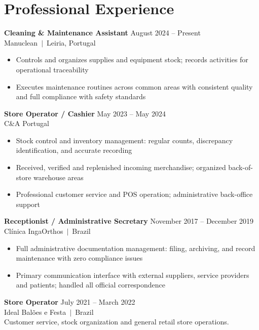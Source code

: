\documentclass[10pt,a4paper]{article}
\begin{document}
\section{Professional Experience}

{\small\bfseries Cleaning \& Maintenance Assistant}\hfill{\small\color{subtle} August 2024 -- Present}\\
{\small\color{accent} Manuclean~$|$~Leiria, Portugal}
\begin{itemize}\small
  \item Controls and organizes supplies and equipment stock; records activities for operational traceability
  \item Executes maintenance routines across common areas with consistent quality and full compliance with safety standards
\end{itemize}

\vspace{4pt}
{\small\bfseries Store Operator / Cashier}\hfill{\small\color{subtle} May 2023 -- May 2024}\\
{\small\color{accent} C\&A Portugal}
\begin{itemize}\small
  \item Stock control and inventory management: regular counts, discrepancy identification, and accurate recording
  \item Received, verified and replenished incoming merchandise; organized back-of-store warehouse areas
  \item Professional customer service and POS operation; administrative back-office support
\end{itemize}

\vspace{4pt}
{\small\bfseries Receptionist / Administrative Secretary}\hfill{\small\color{subtle} November 2017 -- December 2019}\\
{\small\color{accent} Clínica IngaOrthos~$|$~Brazil}
\begin{itemize}\small
  \item Full administrative documentation management: filing, archiving, and record maintenance with zero compliance issues
  \item Primary communication interface with external suppliers, service providers and patients; handled all official correspondence
\end{itemize}

\vspace{4pt}
{\small\bfseries Store Operator}\hfill{\small\color{subtle} July 2021 -- March 2022}\\
{\small\color{accent} Ideal Balões e Festa~$|$~Brazil}\\
{\small Customer service, stock organization and general retail store operations.}
\end{document}
